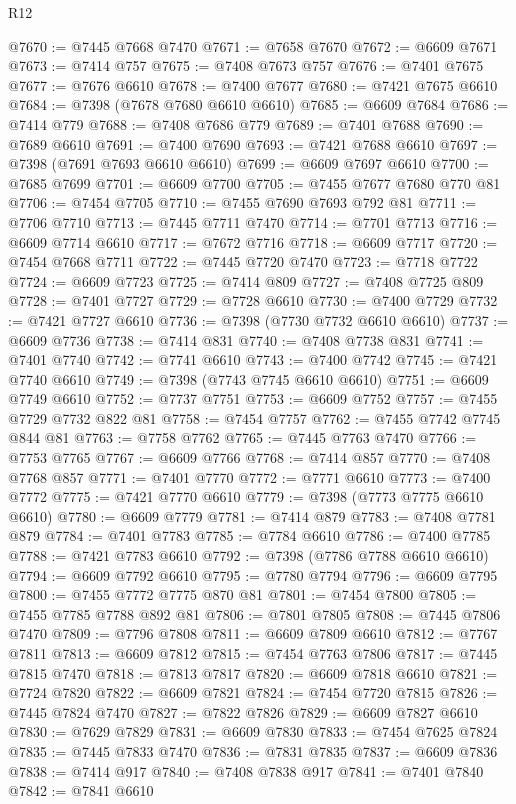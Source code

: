 \begin{lexlean}{R12}
\begin{coremodule}
{{{{{{{{{{{{{{{{{{{{{{{{{{{{{{{{{{{{{{{{{{{{{{{{{{{{{{{{{{{{{{{{{{{{{{{{{{{{{{{{{{@7670 := @7445 @7668 @7470
@7671 := @7658 @7670
@7672 := @6609 @7671
@7673 := @7414 @757
@7675 := @7408 @7673 @757
@7676 := @7401 @7675
@7677 := @7676 @6610
@7678 := @7400 @7677
@7680 := @7421 @7675 @6610
@7684 := @7398 (@7678 @7680 @6610 @6610)
@7685 := @6609 @7684
@7686 := @7414 @779
@7688 := @7408 @7686 @779
@7689 := @7401 @7688
@7690 := @7689 @6610
@7691 := @7400 @7690
@7693 := @7421 @7688 @6610
@7697 := @7398 (@7691 @7693 @6610 @6610)
@7699 := @6609 @7697 @6610
@7700 := @7685 @7699
@7701 := @6609 @7700
@7705 := @7455 @7677 @7680 @770 @81
@7706 := @7454 @7705
@7710 := @7455 @7690 @7693 @792 @81
@7711 := @7706 @7710
@7713 := @7445 @7711 @7470
@7714 := @7701 @7713
@7716 := @6609 @7714 @6610
@7717 := @7672 @7716
@7718 := @6609 @7717
@7720 := @7454 @7668 @7711
@7722 := @7445 @7720 @7470
@7723 := @7718 @7722
@7724 := @6609 @7723
@7725 := @7414 @809
@7727 := @7408 @7725 @809
@7728 := @7401 @7727
@7729 := @7728 @6610
@7730 := @7400 @7729
@7732 := @7421 @7727 @6610
@7736 := @7398 (@7730 @7732 @6610 @6610)
@7737 := @6609 @7736
@7738 := @7414 @831
@7740 := @7408 @7738 @831
@7741 := @7401 @7740
@7742 := @7741 @6610
@7743 := @7400 @7742
@7745 := @7421 @7740 @6610
@7749 := @7398 (@7743 @7745 @6610 @6610)
@7751 := @6609 @7749 @6610
@7752 := @7737 @7751
@7753 := @6609 @7752
@7757 := @7455 @7729 @7732 @822 @81
@7758 := @7454 @7757
@7762 := @7455 @7742 @7745 @844 @81
@7763 := @7758 @7762
@7765 := @7445 @7763 @7470
@7766 := @7753 @7765
@7767 := @6609 @7766
@7768 := @7414 @857
@7770 := @7408 @7768 @857
@7771 := @7401 @7770
@7772 := @7771 @6610
@7773 := @7400 @7772
@7775 := @7421 @7770 @6610
@7779 := @7398 (@7773 @7775 @6610 @6610)
@7780 := @6609 @7779
@7781 := @7414 @879
@7783 := @7408 @7781 @879
@7784 := @7401 @7783
@7785 := @7784 @6610
@7786 := @7400 @7785
@7788 := @7421 @7783 @6610
@7792 := @7398 (@7786 @7788 @6610 @6610)
@7794 := @6609 @7792 @6610
@7795 := @7780 @7794
@7796 := @6609 @7795
@7800 := @7455 @7772 @7775 @870 @81
@7801 := @7454 @7800
@7805 := @7455 @7785 @7788 @892 @81
@7806 := @7801 @7805
@7808 := @7445 @7806 @7470
@7809 := @7796 @7808
@7811 := @6609 @7809 @6610
@7812 := @7767 @7811
@7813 := @6609 @7812
@7815 := @7454 @7763 @7806
@7817 := @7445 @7815 @7470
@7818 := @7813 @7817
@7820 := @6609 @7818 @6610
@7821 := @7724 @7820
@7822 := @6609 @7821
@7824 := @7454 @7720 @7815
@7826 := @7445 @7824 @7470
@7827 := @7822 @7826
@7829 := @6609 @7827 @6610
@7830 := @7629 @7829
@7831 := @6609 @7830
@7833 := @7454 @7625 @7824
@7835 := @7445 @7833 @7470
@7836 := @7831 @7835
@7837 := @6609 @7836
@7838 := @7414 @917
@7840 := @7408 @7838 @917
@7841 := @7401 @7840
@7842 := @7841 @6610
}}}}}}}}}}}}}}}}}}}}}}}}}}}}}}}}}}}}}}}}}}}}}}}}}}}}}}}}}}}}}}}}}}}}}}}}}}}}}}}}}}
\end{coremodule}
\end{lexlean}
